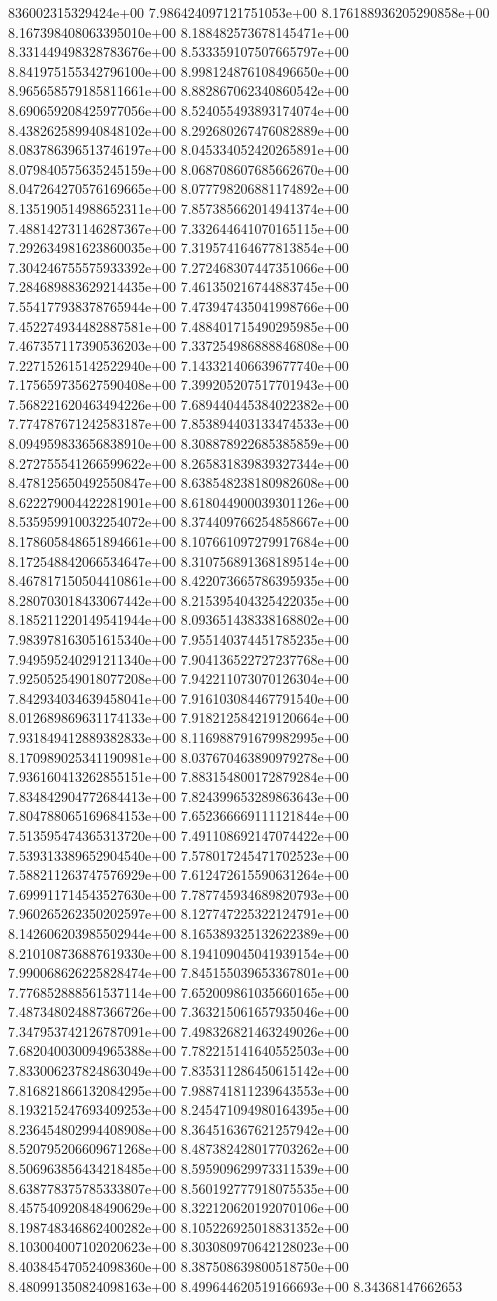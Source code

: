 836002315329424e+00	7.986424097121751053e+00	8.176188936205290858e+00	8.167398408063395010e+00	8.188482573678145471e+00	8.331449498328783676e+00	8.533359107507665797e+00	8.841975155342796100e+00	8.998124876108496650e+00	8.965658579185811661e+00	8.882867062340860542e+00	8.690659208425977056e+00	8.524055493893174074e+00	8.438262589940848102e+00	8.292680267476082889e+00	8.083786396513746197e+00	8.045334052420265891e+00	8.079840575635245159e+00	8.068708607685662670e+00	8.047264270576169665e+00	8.077798206881174892e+00	8.135190514988652311e+00	7.857385662014941374e+00	7.488142731146287367e+00	7.332644641070165115e+00	7.292634981623860035e+00	7.319574164677813854e+00	7.304246755575933392e+00	7.272468307447351066e+00	7.284689883629214435e+00	7.461350216744883745e+00	7.554177938378765944e+00	7.473947435041998766e+00	7.452274934482887581e+00	7.488401715490295985e+00	7.467357117390536203e+00	7.337254986888846808e+00	7.227152615142522940e+00	7.143321406639677740e+00	7.175659735627590408e+00	7.399205207517701943e+00	7.568221620463494226e+00	7.689440445384022382e+00	7.774787671242583187e+00	7.853894403133474533e+00	8.094959833656838910e+00	8.308878922685385859e+00	8.272755541266599622e+00	8.265831839839327344e+00	8.478125650492550847e+00	8.638548238180982608e+00	8.622279004422281901e+00	8.618044900039301126e+00	8.535959910032254072e+00	8.374409766254858667e+00	8.178605848651894661e+00	8.107661097279917684e+00	8.172548842066534647e+00	8.310756891368189514e+00	8.467817150504410861e+00	8.422073665786395935e+00	8.280703018433067442e+00	8.215395404325422035e+00	8.185211220149541944e+00	8.093651438338168802e+00	7.983978163051615340e+00	7.955140374451785235e+00	7.949595240291211340e+00	7.904136522727237768e+00	7.925052549018077208e+00	7.942211073070126304e+00	7.842934034639458041e+00	7.916103084467791540e+00	8.012689869631174133e+00	7.918212584219120664e+00	7.931849412889382833e+00	8.116988791679982995e+00	8.170989025341190981e+00	8.037670463890979278e+00	7.936160413262855151e+00	7.883154800172879284e+00	7.834842904772684413e+00	7.824399653289863643e+00	7.804788065169684153e+00	7.652366669111121844e+00	7.513595474365313720e+00	7.491108692147074422e+00	7.539313389652904540e+00	7.578017245471702523e+00	7.588211263747576929e+00	7.612472615590631264e+00	7.699911714543527630e+00	7.787745934689820793e+00	7.960265262350202597e+00	8.127747225322124791e+00	8.142606203985502944e+00	8.165389325132622389e+00	8.210108736887619330e+00	8.194109045041939154e+00	7.990068626225828474e+00	7.845155039653367801e+00	7.776852888561537114e+00	7.652009861035660165e+00	7.487348024887366726e+00	7.363215061657935046e+00	7.347953742126787091e+00	7.498326821463249026e+00	7.682040030094965388e+00	7.782215141640552503e+00	7.833006237824863049e+00	7.835311286450615142e+00	7.816821866132084295e+00	7.988741811239643553e+00	8.193215247693409253e+00	8.245471094980164395e+00	8.236454802994408908e+00	8.364516367621257942e+00	8.520795206609671268e+00	8.487382428017703262e+00	8.506963856434218485e+00	8.595909629973311539e+00	8.638778375785333807e+00	8.560192777918075535e+00	8.457540920848490629e+00	8.322120620192070106e+00	8.198748346862400282e+00	8.105226925018831352e+00	8.103004007102020623e+00	8.303080970642128023e+00	8.403845470524098360e+00	8.387508639800518750e+00	8.480991350824098163e+00	8.499644620519166693e+00	8.34368147662653